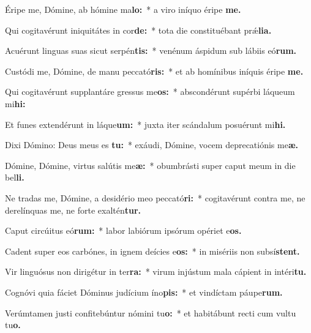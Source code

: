 \item Éripe me, Dómine, ab hómine ma\textbf{lo:}~* a viro iníquo éripe \textbf{me.}
\item Qui cogitavérunt iniquitátes in cor\textbf{de:}~* tota die constituébant prǽ\textbf{lia.}
\item Acuérunt linguas suas sicut serpén\textbf{tis:}~* venénum áspidum sub lábiis eó\textbf{rum.}
\item Custódi me, Dómine, de manu peccató\textbf{ris:}~* et ab homínibus iníquis éripe \textbf{me.}
\item Qui cogitavérunt supplantáre gressus me\textbf{os:}~* abscondérunt supérbi láqueum mi\textbf{hi:}
\item Et funes extendérunt in láque\textbf{um:}~* juxta iter scándalum posuérunt mi\textbf{hi.}
\item Dixi Dómino: Deus meus es \textbf{tu:}~* exáudi, Dómine, vocem deprecatiónis me\textbf{æ.}
\item Dómine, Dómine, virtus salútis me\textbf{æ:}~* obumbrásti super caput meum in die bel\textbf{li.}
\item Ne tradas me, Dómine, a desidério meo peccató\textbf{ri:}~* cogitavérunt contra me, ne derelínquas me, ne forte exaltén\textbf{tur.}
\item Caput circúitus eó\textbf{rum:}~* labor labiórum i\-psórum opériet e\textbf{os.}
\item Cadent super eos carbónes, in ignem deícies e\textbf{os:}~* in misériis non subsí\textbf{stent.}
\item Vir linguósus non dirigétur in ter\textbf{ra:}~* virum injústum mala cápient in intéri\textbf{tu.}
\item Cognóvi quia fáciet Dóminus judícium íno\textbf{pis:}~* et vindí\-ctam páupe\textbf{rum.}
\item Verúmtamen justi confitebúntur nómini tu\textbf{o:}~* et habitábunt re\-cti cum vultu tu\textbf{o.}